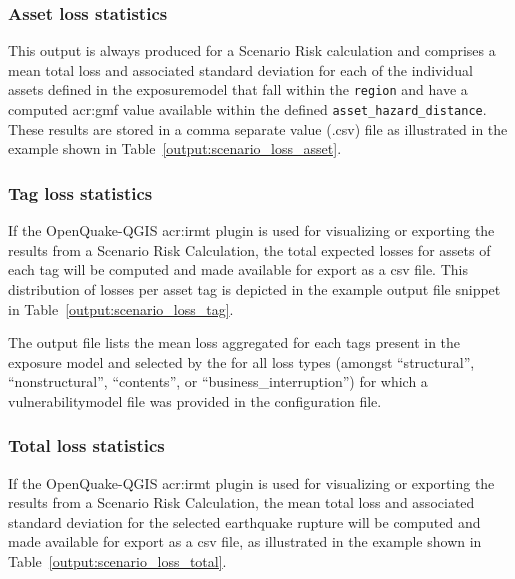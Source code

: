 \subsubsection{Asset loss statistics}
\label{subsubsec:scenario_asset_loss_statistics}

This output is always produced for a Scenario Risk calculation and comprises a
mean total loss and associated standard deviation for each of the individual
\glspl{asset} defined in the \gls{exposuremodel} that fall within the
\Verb+region+ and have a computed \gls{acr:gmf} value available
within the defined \Verb+asset_hazard_distance+. These results are stored in a
comma separate value (.csv) file as illustrated in the example shown in
Table~\ref{output:scenario_loss_asset}.




\subsubsection{Tag loss statistics}
\label{subsubsec:scenario_tag_loss_statistics}

If the OpenQuake-QGIS \gls{acr:irmt} plugin is used for visualizing or
exporting the results from a Scenario Risk Calculation, the total expected
losses for assets of each \gls{tag} will be computed and made available for
export as a csv file. This distribution of losses per asset \gls{tag} is
depicted in the example output file snippet in
Table~\ref{output:scenario_loss_tag}.



The output file lists the mean loss aggregated for each \glspl{tag}
present in the exposure model and selected by the for all loss types (amongst ``structural'',
``nonstructural'', ``contents'', or ``business\_interruption'') for which a
\gls{vulnerabilitymodel} file was provided in the configuration file.


\subsubsection{Total loss statistics}
\label{subsubsec:scenario_total_loss_statistics}

If the OpenQuake-QGIS \gls{acr:irmt} plugin is used for visualizing or
exporting the results from a Scenario Risk Calculation, the mean total loss
and associated standard deviation for the selected earthquake rupture will be
computed and made available for export as a csv file, as illustrated in the
example shown in Table~\ref{output:scenario_loss_total}.

